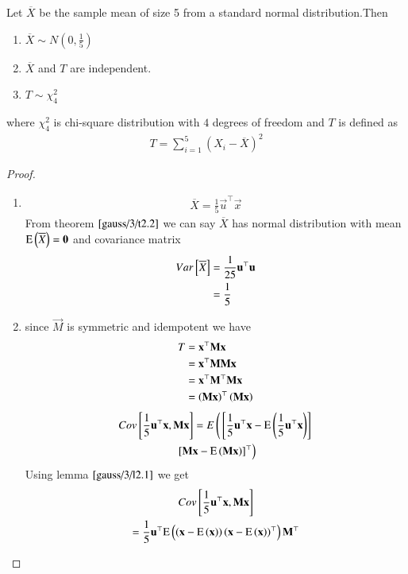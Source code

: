 \begin{theorem}
Let $\overline{X}$ be the sample mean of size 5 from a standard normal distribution.Then
\begin{enumerate}
    \item $\overline{X} \sim N(0,\frac{1}{5})$
    \item $\overline{X}$ and $T$ are independent.
    \item $T \sim \chi_{4}^2$
\end{enumerate} 
where $\chi_{4}^2$  is  chi-square distribution
with   $4$ degrees of freedom and $T$ is defined as
\begin{align}
    T=\sum_{i=1}^{5}(X_i-\overline{X})^2
\end{align}
\end{theorem}
\begin{proof}
\begin{enumerate}
\item 
\begin{align}
    \overline{X}=\frac{1}{5}\vec{u}^{\top}\vec{x}\label{gauss/3/3.1}
\end{align}
From theorem $\ref{gauss/3/t2.2}$ we can say $\overline{X}$ has normal distribution with mean $\text{E}\left( \overline{X} \right)=\mathbf{0}$ and covariance matrix
\begin{align}
    Var{}\left[\overline{X}\right]&=\frac{1}{25}\mathbf{u}^{\top}\mathbf{u}\\
    &=\frac{1}{5}
\end{align}
\item since $\vec{M}$ is symmetric and idempotent we have
\begin{align}
   T&=\mathbf{x}^{\top}\mathbf{M}\mathbf{x}\\
    &=\mathbf{x}^{\top}\mathbf{M}\mathbf{M}\mathbf{x}\\
    &=\mathbf{x}^{\top}\mathbf{M}^{\top}\mathbf{M}\mathbf{x}\\
    &=\left(\mathbf{M}\mathbf{x}\right)^{\top}\left(\mathbf{M}\mathbf{x}\right)\label{gauss/3/3.5} 
\end{align}
\begin{multline}
    Cov{}\left[\frac{1}{5}\mathbf{u}^{\top}\mathbf{x},\mathbf{M}\mathbf{x}\right]
    =E\left({}\left[\frac{1}{5}\mathbf{u}^{\top}\mathbf{x}-\text{E}\left( \frac{1}{5}\mathbf{u}^{\top}\mathbf{x} \right)\right]\right.
    \\
\left.{}\left[\mathbf{M}\mathbf{x}-\text{E}\left( \mathbf{M}\mathbf{x} \right)\right]^{\top}\right)
\end{multline}
Using lemma $\ref{gauss/3/l2.1}$ we get
\begin{multline}
  Cov\sbrak{\frac{1}{5}\vec{u}^{\top}\vec{x},\vec{M}\vec{x}}\\=\frac{1}{5}\vec{u}^{\top}\mean{\brak{\vec{x}-\mean{\vec{x}}}\brak{\vec{x}-\mean{\vec{x}}}^{\top}}\vec{M}^{\top}  

\end{multline}
\end{enumerate}
\end{proof}
